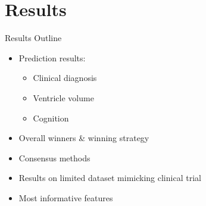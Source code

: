 \documentclass[8pt,xcolor=table,aspectratio=169]{beamer}
\begin{document}
\section{Results}

\begin{frame}{Results Outline}


\begin{itemize}
\item Prediction results:
\begin{itemize}
 \item Clinical diagnosis
  \item Ventricle volume
  \item Cognition
\end{itemize}

\vspace{2em}

\item Overall winners \& winning strategy

\vspace{2em}

\item Consensus methods

\vspace{2em}

\item Results on limited dataset mimicking clinical trial

\vspace{2em}

\item Most informative features

\end{itemize}

\end{frame}


\newcommand{\reducedstrut}{\vrule width 0pt height .9\ht\strutbox depth .9\dp\strutbox\relax}

\newcommand{\colbox}[2]{%
  \begingroup
  \setlength{\fboxsep}{0pt}%
  \colorbox{#1}{\reducedstrut{#2}\/}%
  \endgroup
}
\end{document}
